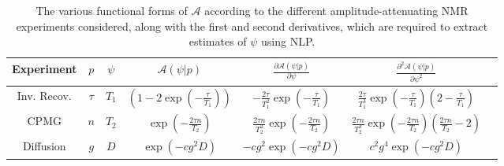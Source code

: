 \begin{table}
    \begin{center}
        \begin{tabular}{ccccccc}
            \hline
            Experiment &
            $p$ &
            $\psi$ &
            $\mathcal{A}(\psi | p)$ &
            $\frac{\partial \mathcal{A}(\psi | p)}{\partial \psi}$ &
            $\frac{\partial^2 \mathcal{A}(\psi | p)}{\partial \psi^2}$ \\ \hline
            Inv. Recov.&
            $\tau$ &
            $T_1$ &
            $\left(1 - 2 \exp \left(-\frac{\tau}{T_{1}}\right)\right)$ &
            $-\frac{2 \tau}{T_1^2} \exp\left(-\frac{\tau}{T_1}\right)$ &
            $\frac{2 \tau}{T_1^3} \exp\left(-\frac{\tau}{T_1}\right)\left(2 - \frac{\tau}{T_1}\right)$\\
            \acs{CPMG} &
            $n$ &
            $T_2$ &
            $\exp\left(-\frac{2 \tau n}{T_2}\right)$ &
            $\frac{2 \tau n}{T_2^2}\exp\left(-\frac{2 \tau n}{T_2}\right)$ &
            $\frac{2 \tau n}{T_2^3}\exp\left(-\frac{2 \tau n}{T_2}\right)
            \left( \frac{2 \tau n}{T_2} - 2 \right)$ \\
            Diffusion &
            $g$ &
            $D$ &
            $\exp\left(-c g^2 D\right)$ &
            $-c g^2 \exp\left(-c g^2 D\right)$ &
            $c^2 g^4 \exp\left(-c g^2 D\right)$ \\
            \hline
       \end{tabular}
       \caption[
           The various functional forms of $\mathcal{A}$ according to the
           different amplitude-attenuating NMR experiments considered.
       ]
       {
           The various functional forms of $\mathcal{A}$ according to the
           different amplitude-attenuating NMR experiments considered, along
           with the first and second derivatives, which are required to extract
           estimates of $\psi$ using \ac{NLP}.
       }
       \label{tab:seq-equations}
    \end{center}
\end{table}

